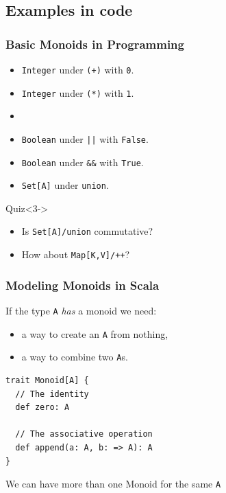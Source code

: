 \documentclass{beamer}
\begin{document}
\subsection{Examples in code}

\begin{frame}\frametitle{Basic Monoids in Programming}
  \begin{itemize}
    \item<1-> \texttt{Integer} under \texttt{(+)} with \texttt{0}.
    \item<1-> \texttt{Integer} under \texttt{(*)} with \texttt{1}.
    \item{}
    \item<3-> \texttt{Boolean} under \texttt{||} with \texttt{False}.
    \item<3-> \texttt{Boolean} under \texttt{\&\&} with \texttt{True}.
    \item<3-> \texttt{Set[A]} under \texttt{union}.
  \end{itemize}

  \begin{block}{Quiz}<3->
    \begin{itemize}
    \item Is \texttt{Set[A]/union} commutative?
    \item How about \texttt{Map[K,V]/++}?
    \end{itemize}
  \end{block}
  \end{frame}

\begin{frame}[fragile]\frametitle{Modeling Monoids in Scala}
  If the type \texttt{A} \emph{has} a monoid we need:
  \begin{itemize}
    \item a way to create an \texttt{A} from nothing,
    \item a way to combine two \texttt{A}s.
  \end{itemize}
  \pause

  \begin{block}{}
  \begin{lstlisting}
trait Monoid[A] {
  // The identity
  def zero: A

  // The associative operation
  def append(a: A, b: => A): A
}
  \end{lstlisting}
  \end{block}
  We can have more than one Monoid for the same \texttt{A}
\end{frame}
\end{document}
